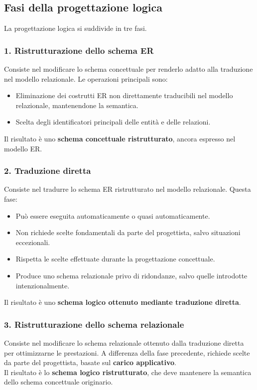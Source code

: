 \subsection{Fasi della progettazione logica}
La progettazione logica si suddivide in tre fasi.
\subsubsection{1. Ristrutturazione dello schema ER}
Consiste nel modificare lo schema concettuale per renderlo
adatto alla traduzione nel modello relazionale.
Le operazioni principali sono:
\begin{itemize}
    \item Eliminazione dei costrutti ER non direttamente
    traducibili nel modello relazionale, mantenendone
    la semantica.
    \item Scelta degli identificatori principali delle
    entità e delle relazioni.
\end{itemize}
\noindent
Il risultato è uno \textbf{schema concettuale ristrutturato},
ancora espresso nel modello ER.

\subsubsection{2. Traduzione diretta}
Consiste nel tradurre lo schema ER ristrutturato
nel modello relazionale.
Questa fase:
\begin{itemize}
    \item Può essere eseguita automaticamente o quasi
    automaticamente.
    \item Non richiede scelte fondamentali da parte del
    progettista, salvo situazioni eccezionali.
    \item Rispetta le scelte effettuate durante la
    progettazione concettuale.
    \item Produce uno schema relazionale privo di
    ridondanze, salvo quelle introdotte intenzionalmente.
\end{itemize}
\noindent
Il risultato è uno \textbf{schema logico ottenuto
mediante traduzione diretta}.
\subsubsection{3. Ristrutturazione dello schema relazionale}
Consiste nel modificare lo schema relazionale ottenuto
dalla traduzione diretta per ottimizzarne le prestazioni.
A differenza della fase precedente, richiede scelte
da parte del progettista, basate sul
\textbf{carico applicativo}.\\
Il risultato è lo \textbf{schema logico ristrutturato},
che deve mantenere la semantica dello schema concettuale
originario.
